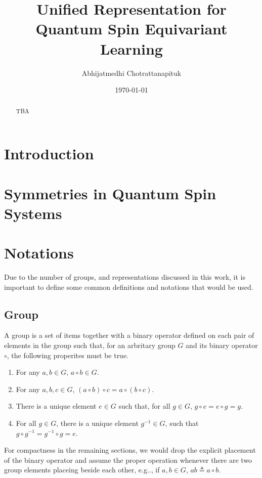 \documentclass[preprint, 12pt]{revtex4-2}
\numberwithin{equation}{section}
\begin{document}
\title{Unified Representation for Quantum Spin Equivariant Learning}

\author{Abhijatmedhi Chotrattanapituk}

\date{\today}

\begin{abstract}
    TBA
\end{abstract}

\maketitle
\newpage

\section{Introduction}

\section{Symmetries in Quantum Spin Systems}

\section{Notations}
Due to the number of groups, and representations discussed in this work, it is important to define some common definitions and notations that would be used. 

\subsection{Group}
A group is a set of items together with a binary operator defined on each pair of elements in the group such that, for an arbritary group $G$ and its binary operator $\circ$, the following properites must be true.
\begin{enumerate}
    \item For any $a, b\in G$, $a\circ b\in G$.
    \item For any $a, b, c\in G$, $(a\circ b)\circ c = a\circ(b\circ c)$.
    \item There is a unique element $e\in G$ such that, for all $g\in G,\, g\circ e=e\circ g=g$.
    \item For all $g\in G$, there is a unique element $g^{-1}\in G$, such that $g\circ g^{-1}=g^{-1}\circ g=e$.
\end{enumerate}
For compactness in the remaining sections, we would drop the explicit placement of the binary operator and assume the proper operation whenever there are two group elements placeing beside each other, e.g.., if $a, b\in G$, $ab\triangleq a\circ b.$
\end{document}

